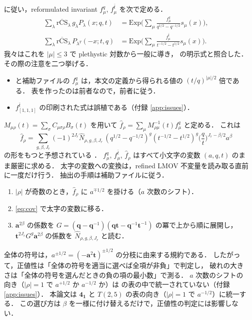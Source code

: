 \documentclass[11pt,a4paper]{ltjsarticle}
\theoremstyle{definition}
\theoremstyle{remark}
\newcommand{\rCS}{\overline{\mathrm{rCS}}}
\newcommand{\ba}{\mathbf{a}}
\newcommand{\bq}{\mathbf{q}}
\newcommand{\bt}{\mathbf{t}}
\newcommand{\hN}{\widehat{N}}
\newcommand{\hf}{\widehat{f}}
\begin{document}
\cite{KN} に従い，reformulated invariant $f^q_\mu$, $f^{\bar t}_\mu$ を次で定める．
\begin{align}
\sum_\lambda\rCS_\lambda\,g_\lambda P_\lambda(x;q,t)&=\mathrm{Exp}\Big(\sum_\mu\frac{f^q_\mu}{q^{1/2}-q^{-1/2}}s_\mu(x)\Big),\\
\sum_\lambda\rCS_\lambda\,P_{\lambda^T}(-x;t,q)&=\mathrm{Exp}\Big(\sum_\mu\frac{f^{\bar t}_\mu}{t^{-1/2}-t^{1/2}}s_\mu(x)\Big).
\end{align}
我々はこれを $|\mu|\le3$ で plethystic 対数から一般に導き，\cite[付録 B]{KN} の明示式と照合した．
その際の注意を二つ挙げる．
\begin{itemize}
\item \cite[付録 B]{KN} と補助ファイルの $f^q_\mu$ は，本文の定義から得られる値の $(t/q)^{|\mu|/2}$ 倍である．
  表を作ったのは前者なので，前者に従う．
\item $f^{\bar t}_{[1,1,1]}$ の印刷された式は誤植である（付録 \ref{app:issues}）．
\end{itemize}
$M_{\mu\rho}(t)=\sum_\sigma C_{\mu\sigma\rho}B_\sigma(t)$ を用いて $\hf_\rho=\sum_\mu M^{-1}_{\rho\mu}(t)f^q_\mu$ と定める．
これは
\begin{equation}
\hf_\rho=\sum_{g,\beta,J_r}(-1)^{2J_r}\hN_{\rho,g,\beta,J_r}\,(q^{1/2}-q^{-1/2})^g(t^{-1/2}-t^{1/2})^g\Big(\frac{q}{t}\Big)^{J_r-\beta/2}a^\beta
\end{equation}
の形をもつと予想されている \cite[\S4]{KN}．
$f^q_\mu$, $f^{\bar t}_\mu$, $\hf_\rho$ はすべて小文字の変数 $(a,q,t)$ のまま厳密に求める．
太字の変数への変換は，refined LMOV 不変量を読み取る直前に一度だけ行う．
抽出の手順は補助ファイルに従う．
\begin{enumerate}
\item $|\rho|$ が奇数のとき，$\hf_\rho$ に $a^{\mp1/2}$ を掛ける（$a$ 次数のシフト）．
\item \eqref{eq:cov} で太字の変数に移る．
\item $\ba^{2\beta}$ の係数を $G=(\bq-\bq^{-1})(\bq\bt-\bq^{-1}\bt^{-1})$ の冪で上から順に展開し，
  $\bt^{2J_r}G^g\ba^{2\beta}$ の係数を $\hN_{\rho,g,\beta,J_r}$ と読む．
\end{enumerate}
全体の符号は，$a^{\pm1/2}=(-\ba^2\bt)^{\pm1/2}$ の分枝に由来する規約である．
したがって，正値性は「全体の符号を適当に選べば全項が非負」で判定し，
破れの大きさは「全体の符号を選んだときの負の項の最小数」で測る．
$a$ 次数のシフトの向き（$|\rho|=1$ で $a^{+1/2}$ か $a^{-1/2}$ か）は \cite{KN} の表の中で統一されていない（付録 \ref{app:issues}）．
本論文は $\mathbf{4_1}$ と $T(2,5)$ の表の向き（$|\rho|=1$ で $a^{-1/2}$）に統一する．
この選び方は $\beta$ を一様に付け替えるだけで，正値性の判定には影響しない．
\end{document}
